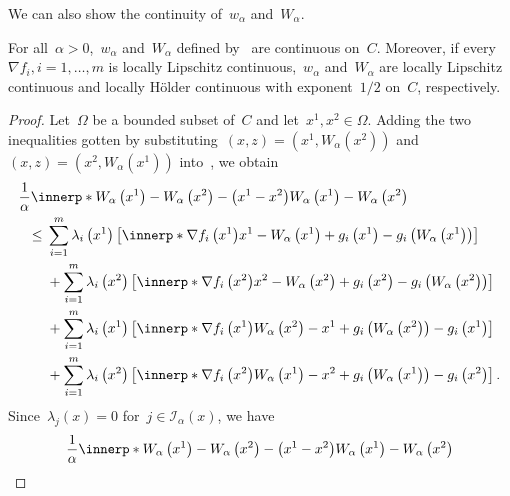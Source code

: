 \documentclass[../../main]{subfiles}
\begin{document}
We can also show the continuity of~$w_\alpha$ and~$W_\alpha$.
\begin{theorem} 
    For all~$\alpha > 0$,~$w_\alpha$ and~$W_\alpha$ defined by~ are continuous on~$C$.
    Moreover, if every~$\nabla f_i, i = 1, \dots, m$ is locally Lipschitz continuous,~$w_\alpha$ and~$W_\alpha$ are locally Lipschitz continuous and locally H\"older continuous with exponent~$1 / 2$ on~$C$, respectively.
\end{theorem}
\begin{proof}
    Let~$\Omega$ be a bounded subset of~$C$ and let~$x^1, x^2 \in \Omega$.
    Adding the two inequalities gotten by substituting~$(x, z) = (x^1, W_\alpha\left(x^2\right))$ and~$(x, z) = (x^2, W_\alpha\left(x^1\right))$ into~, we obtain
    \begin{align}
        \MoveEqLeft \frac{1}{\alpha} \innerp*{W_\alpha\left(x^1\right) - W_\alpha\left(x^2\right) - \left(x^1 - x^2\right)}{W_\alpha\left(x^1\right) - W_\alpha\left(x^2\right)}                                  \\
        \le{} & \sum_{i = 1}^{m} \lambda_i\left(x^1\right)\left[ \innerp*{\nabla f_i\left(x^1\right)}{x^1 - W_\alpha\left(x^1\right)} + g_i\left(x^1\right) - g_i\left(W_\alpha\left(x^1\right)\right) \right]    \\
              & + \sum_{i = 1}^{m} \lambda_i\left(x^2\right) \left[ \innerp*{\nabla f_i\left(x^2\right)}{x^2 - W_\alpha\left(x^2\right)} + g_i\left(x^2\right) - g_i\left(W_\alpha\left(x^2\right)\right) \right] \\
              & + \sum_{i = 1}^{m} \lambda_i\left(x^1\right) \left[ \innerp*{\nabla f_i\left(x^1\right)}{W_\alpha\left(x^2\right) - x^1} + g_i\left(W_\alpha\left(x^2\right)\right) - g_i\left(x^1\right) \right] \\
              & + \sum_{i = 1}^{m} \lambda_i\left(x^2\right) \left[ \innerp*{\nabla f_i\left(x^2\right)}{W_\alpha\left(x^1\right) - x^2} + g_i\left(W_\alpha\left(x^1\right)\right) - g_i\left(x^2\right) \right]
        .\end{align}
    Since~$\lambda_j(x) = 0$ for~$j \in \mathcal{I}_\alpha(x)$, we have
    \begin{align}
        \MoveEqLeft \frac{1}{\alpha} \innerp*{W_\alpha\left(x^1\right) - W_\alpha\left(x^2\right) - \left(x^1 - x^2\right)}{W_\alpha\left(x^1\right) - W_\alpha\left(x^2\right)}                                  \\

\end{align}
\end{proof}
\end{document}
